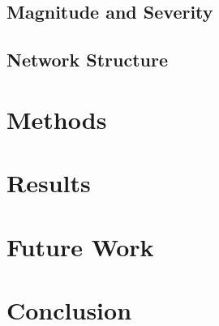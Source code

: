\documentclass[letterpaper]{article}
\begin{document}
\subsection{Magnitude and Severity}


\subsection{Network Structure}


\section{Methods }


\section{Results}



\section{Future Work}


\section{Conclusion}











\end{document}
